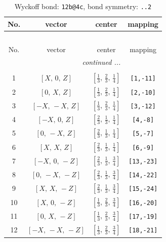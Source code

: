 \documentclass[fleqn,8pt]{jsarticle}
\begin{document}
\begin{longtable}{cccc}
\caption{Wyckoff bond: {\tt 12b@4c}, bond symmetry: {\tt ..2}}
 \\
 \hline \hline
No. & vector & center & mapping \\ \hline \endfirsthead

\multicolumn{3}{l}{\tablename\ \thetable{}} \\
 \hline \hline
No. & vector & center & mapping \\ \hline \endhead

 \hline \hline
\multicolumn{3}{r}{\footnotesize\it continued ...} \\ \endfoot

 \hline \hline
\multicolumn{3}{r}{} \\ \endlastfoot

1 & $\left[ X,\, 0,\, Z \right]$ & $\left[ \frac{1}{3},\, \frac{2}{3},\, \frac{1}{4} \right]$ & {\tt [1,-11]} \\ \hline
2 & $\left[ 0,\, X,\, Z \right]$ & $\left[ \frac{1}{3},\, \frac{2}{3},\, \frac{1}{4} \right]$ & {\tt [2,-10]} \\ \hline
3 & $\left[ - X,\, - X,\, Z \right]$ & $\left[ \frac{1}{3},\, \frac{2}{3},\, \frac{1}{4} \right]$ & {\tt [3,-12]} \\ \hline
4 & $\left[ - X,\, 0,\, Z \right]$ & $\left[ \frac{2}{3},\, \frac{1}{3},\, \frac{1}{4} \right]$ & {\tt [4,-8]} \\ \hline
5 & $\left[ 0,\, - X,\, Z \right]$ & $\left[ \frac{2}{3},\, \frac{1}{3},\, \frac{1}{4} \right]$ & {\tt [5,-7]} \\ \hline
6 & $\left[ X,\, X,\, Z \right]$ & $\left[ \frac{2}{3},\, \frac{1}{3},\, \frac{1}{4} \right]$ & {\tt [6,-9]} \\ \hline
7 & $\left[ - X,\, 0,\, - Z \right]$ & $\left[ \frac{2}{3},\, \frac{1}{3},\, \frac{3}{4} \right]$ & {\tt [13,-23]} \\ \hline
8 & $\left[ 0,\, - X,\, - Z \right]$ & $\left[ \frac{2}{3},\, \frac{1}{3},\, \frac{3}{4} \right]$ & {\tt [14,-22]} \\ \hline
9 & $\left[ X,\, X,\, - Z \right]$ & $\left[ \frac{2}{3},\, \frac{1}{3},\, \frac{3}{4} \right]$ & {\tt [15,-24]} \\ \hline
10 & $\left[ X,\, 0,\, - Z \right]$ & $\left[ \frac{1}{3},\, \frac{2}{3},\, \frac{3}{4} \right]$ & {\tt [16,-20]} \\ \hline
11 & $\left[ 0,\, X,\, - Z \right]$ & $\left[ \frac{1}{3},\, \frac{2}{3},\, \frac{3}{4} \right]$ & {\tt [17,-19]} \\ \hline
12 & $\left[ - X,\, - X,\, - Z \right]$ & $\left[ \frac{1}{3},\, \frac{2}{3},\, \frac{3}{4} \right]$ & {\tt [18,-21]} \\
\end{longtable}
\end{document}
